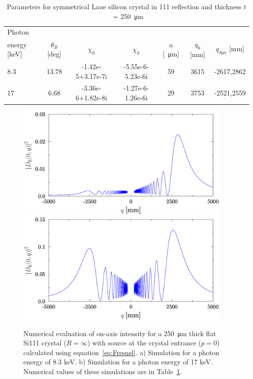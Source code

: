 \documentclass[preprint]{iucr}              %
\newcommand{\inred}[1]{{\color{red}#1}}
\begin{document}
\begin{table}
\caption{Parameters for symmetrical Laue silicon crystal in 111 reflection and thickness $t$~= \SI{250}{\micro\meter}}
\begin{tabular}{lcccccc}
 Photon \\energy  [keV]  & $\theta_B$ [deg]       & $\chi_0$ & $\chi_h$ & $a$ [\SI{}{\micro\meter}]& $q_0$ [mm] & $q_{dyn}$  [mm] \\
\hline
 8.3  &  13.78 & -1.42e-5+3.17e-7i & -5.55e-6-5.23e-6i  & 59  & 3615  & \inred{-2617,}2862   \\
 17   &  6.68 & -3.36e-6+1.82e-8i & -1.27e-6-1.26e-6i  & 29  & 3753  & \inred{-2521,}2559 
\end{tabular}
\label{table:example}
\end{table}


\begin{figure}
\label{fig:flatLaue}
\caption{Numerical evaluation of on-axis intensity for a  \SI{250}{\micro\meter} thick flat Si111 crystal ($R=\infty$) with source at the crystal entrance ($p=0$) calculated using equation~\ref{eq:Fresnel}.
a) Simulation for a photon energy of 8.3 keV.
b) Simulation for a photon energy of 17 keV.
Numerical values of these simulations are in Table~\ref{table:example}.
}
\includegraphics[width=0.95\textwidth]{flat8keV.eps}
\includegraphics[width=0.95\textwidth]{flat17keV.eps}
\end{figure}
\end{document}

